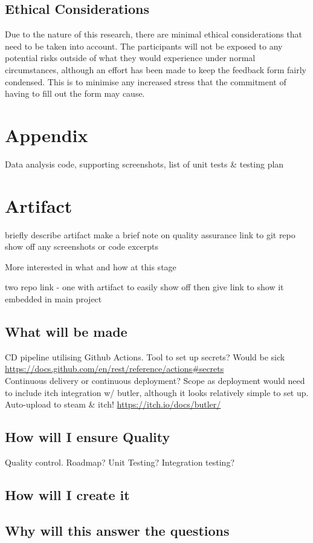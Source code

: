 \documentclass[lettersize,journal]{IEEEtran}
\begin{document}
    \subsection{Ethical Considerations}
        Due to the nature of this research, there are minimal ethical considerations that need to be taken into account. The participants will not be exposed to any potential risks outside of what they would experience under normal circumstances, although an effort has been made to keep the feedback form fairly condensed. This is to minimise any increased stress that the commitment of having to fill out the form may cause.
    
    \section{Appendix}
    Data analysis code, supporting screenshots, list of unit tests \& testing plan

\section{Artifact}
    briefly describe artifact
    make a brief note on quality assurance
    link to git repo
    show off any screenshots or code excerpts

    More interested in what and how at this stage

    two repo link - one with artifact to easily show off then give link to show it embedded in main project
    \subsection{What will be made}
        CD pipeline utilising Github Actions. Tool to set up secrets? Would be sick \url{https://docs.github.com/en/rest/reference/actions#secrets} \\
        Continuous delivery or continuous deployment? Scope as deployment would need to include itch integration w/ butler, although it looks relatively simple to set up.
        Auto-upload to steam \& itch! \url{https://itch.io/docs/butler/}

    \subsection{How will I ensure Quality}
        Quality control. Roadmap? Unit Testing? Integration testing?

    \subsection{How will I create it}

    \subsection{Why will this answer the questions}



\end{document}
